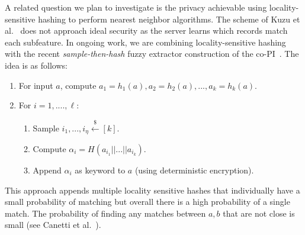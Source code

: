  A related question we plan to investigate is the privacy achievable using locality-sensitive hashing to perform nearest neighbor algorithms.
The scheme of Kuzu et al.~\cite{kuzu2012efficient}  does not approach ideal security as the server learns which records match each subfeature.  In ongoing work, we are combining locality-sensitive hashing with the recent \emph{sample-then-hash} fuzzy extractor construction of the co-PI~\cite{EC:CFPRS16}.  The idea is as follows:

\begin{enumerate}\setlength\itemsep{0em}
\item For input $a$, compute $a_1 = h_1(a), a_2 = h_2(a),..., a_k = h_k(a)$.
\item For $i=1,...., \ell$:
\begin{enumerate}\setlength\itemsep{0em}
\item Sample $i_1,..., i_\eta\overset{\$}\leftarrow [k]$.
\item Compute $\alpha_i = H(a_{i_1} || ... || a_{i_k})$.
\item Append $\alpha_i$ as keyword to $a$ (using deterministic encryption).
\end{enumerate}
\end{enumerate}
\noindent
This approach appends multiple locality sensitive hashes that individually have a small probability of matching but overall there is a high probability of a single match.  The probability of finding any matches between $a,b$ that are not close is small (see Canetti et al.~\cite{EC:CFPRS16}).
